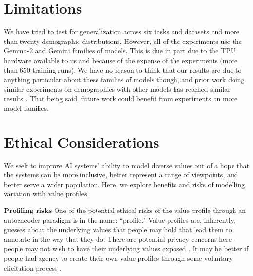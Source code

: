 \documentclass[11pt]{article}
\begin{document}
\newpage

\section{Limitations}
\label{sec:limitations}
We have tried to test for generalization across six tasks and datasets and more than twenty demographic distributions, However, all of the experiments use the Gemma-2 \citep{gemmateam2024gemma2improvingopen} and Gemini \citep{geminiteam2024gemini15unlockingmultimodal} families of models. This is due in part due to the TPU hardware available to us and because of the expense of the experiments (more than 650 training runs). We have no reason to think that our results are due to anything particular about these families of models though, and prior work doing similar experiments on demographics with other models has reached similar results \citep{orlikowski-etal-2023-ecological, hwang2023aligninglanguagemodelsuser}. That being said, future work could benefit from experiments on more model families.

\section{Ethical Considerations}
\label{sec:ethicalconsiderations}

We seek to improve AI systems' ability to model diverse values out of a hope that the systems can be more inclusive, better represent a range of viewpoints, and better serve a wider population. Here, we explore benefits and risks of modelling variation with value profiles.

\textbf{Profiling risks}
One of the potential ethical risks of the value profile through an autoencoder paradigm is in the name: ``profile." Value profiles are, inherently, guesses about the underlying values that people may hold that lead them to annotate in the way that they do. There are potential privacy concerns here - people may not wish to have their underlying values exposed \citep{tomasev-etal}.
It may be better if people had agency to create their own value profiles through some voluntary elicitation process \citep{park2024generativeagentsimulations1000}.
\end{document}
